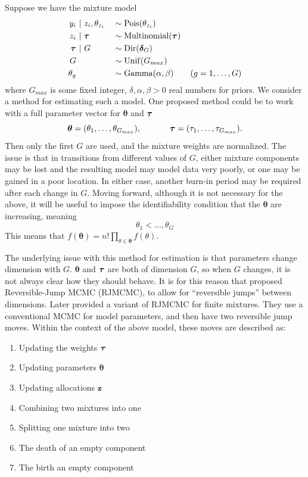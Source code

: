 \documentclass[twoside,12pt,bibstyle=chem-acs]{reedthesis}
\begin{document}
Suppose we have the mixture model
\begin{alignat*}{2}
y_i &~|~ z_i, \theta_{z_i} 	&&\sim \mathrm{Pois}(\theta_{z_i}) \\
z_i &~|~ \bm{\tau}		&&\sim \mathrm{Multinomial}(\bm{\tau}) \\
\bm{\tau} &~|~ G			&&\sim \mathrm{Dir}(\bm\delta_G) \\
G& 					&&\sim \mathrm{Unif}(G_{max}) \\
\theta_g&				&&\sim\mathrm{Gamma}(\alpha, \beta) \tag{$g = 1, \dots, G$}
\end{alignat*}
where $G_{max}$ is some fixed integer, $\delta, \alpha, \beta > 0$ real numbers for priors.
We consider a method for estimating such a model. One proposed method could be to work with a full parameter vector for $\bm\theta$ and $\bm{\tau}$
\begin{equation*}
\bm\theta = (\theta_1, \dots, \theta_{G_{max}}), \hspace{0.1\linewidth} \bm\mix = (\tau_1, \dots, \tau_{G_{max}}).
\end{equation*}
Then only the first $G$ are used, and the mixture weights are normalized. The issue is that in transitions from different values of $G$, either mixture components may be lost and the resulting model may model data very poorly, or one may be gained in a poor location. In either case, another burn-in period may be required after each change in $G$. Moving forward, although it is not necessary for the above, it will be useful to impose the identifiability condition that the $\bm\theta$ are increasing, meaning
\begin{equation*}
\theta_1 < \dots, \theta_G
\end{equation*}
This means that $f(\bm\theta) = n! \prod_{\theta \in \bm\theta} f(\theta)$.

The underlying issue with this method for estimation is that parameters change dimension with $G$. $\bm\theta$ and $\bm{\tau}$ are both of dimension $G$, so when $G$ changes, it is not always clear how they should behave. It is for this reason that \citeauthor{green_reversible_1995} proposed Reversible-Jump MCMC (RJMCMC), to allow for ``reversible jumps'' between dimensions. Later \citeauthor{richardson_bayesian_1997} provided a variant of RJMCMC for finite mixtures. They use a conventional MCMC for model parameters, and then have two reversible jump moves. Within the context of the above model, these moves are described as:
\begin{enumerate}
\itemsep-0.375em
\item[(a)] Updating the weights $\bm{\tau}$
\item[(b)] Updating parameters $\bm\theta$
\item[(c)] Updating allocations $\bm{z}$
\item[(d.i)] Combining two mixtures into one
\item[(d.ii)] Splitting one mixture into two
\item[(e.i)] The death of an empty component
\item[(e.ii)] The birth an empty component
\end{enumerate}
\end{document}
